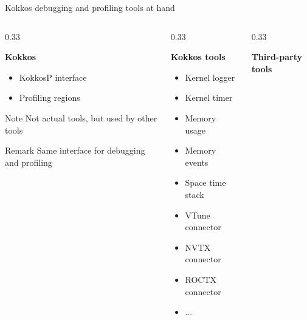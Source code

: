 \documentclass[
    aspectratio=169,
]{beamer}
\begin{document}
\begin{frame}{Kokkos debugging and profiling tools at hand}
    \begin{columns}[T]
        \begin{column}{0.33\linewidth}
            \begin{center}
                \textbf{Kokkos}
            \end{center}
            \begin{itemize}
                \item KokkosP interface
                \item Profiling regions
            \end{itemize}
            \begin{block}{Note}
                Not actual tools, but used by other tools
            \end{block}
            \begin{block}{Remark}
                Same interface for debugging and profiling
            \end{block}
        \end{column}
        \pause
        \begin{column}{0.33\linewidth}
            \begin{center}
                \textbf{Kokkos tools}
            \end{center}
            \begin{itemize}
                \item Kernel logger
                \item Kernel timer
                \item Memory usage
                \item Memory events
                \item Space time stack
                \item VTune connector
                \item NVTX connector
                \item ROCTX connector
                \item ...
            \end{itemize}
        \end{column}
        \pause
        \begin{column}{0.33\linewidth}
            \begin{center}
                \textbf{Third-party tools}
            \end{center}
            \begin{itemize}

\end{itemize}
\end{column}
\end{columns}
\end{frame}
\end{document}
